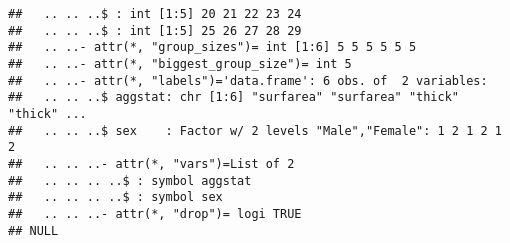 \documentclass[12pt]{article}\usepackage[]{graphicx}\usepackage[]{color}
\makeatletter
\newenvironment{kframe}{%
 \def\at@end@of@kframe{}%
 \ifinner\ifhmode%
  \def\at@end@of@kframe{\end{minipage}}%
  \begin{minipage}{\columnwidth}%
 \fi\fi%
 \def\FrameCommand##1{\hskip\@totalleftmargin \hskip-\fboxsep
 \colorbox{shadecolor}{##1}\hskip-\fboxsep
     \hskip-\linewidth \hskip-\@totalleftmargin \hskip\columnwidth}%
 \MakeFramed {\advance\hsize-\width
   \@totalleftmargin\z@ \linewidth\hsize
   \@setminipage}}%
 {\par\unskip\endMakeFramed%
 \at@end@of@kframe}
\newenvironment{knitrout}{}{} %
\makeatother
\begin{document}
\begin{knitrout}
\begin{kframe}
\begin{verbatim}
##   .. .. ..$ : int [1:5] 20 21 22 23 24
##   .. .. ..$ : int [1:5] 25 26 27 28 29
##   .. ..- attr(*, "group_sizes")= int [1:6] 5 5 5 5 5 5
##   .. ..- attr(*, "biggest_group_size")= int 5
##   .. ..- attr(*, "labels")='data.frame':	6 obs. of  2 variables:
##   .. .. ..$ aggstat: chr [1:6] "surfarea" "surfarea" "thick" "thick" ...
##   .. .. ..$ sex    : Factor w/ 2 levels "Male","Female": 1 2 1 2 1 2
##   .. .. ..- attr(*, "vars")=List of 2
##   .. .. .. ..$ : symbol aggstat
##   .. .. .. ..$ : symbol sex
##   .. .. ..- attr(*, "drop")= logi TRUE
## NULL
\end{verbatim}
\end{kframe}
\end{knitrout}







% 














\end{document}
